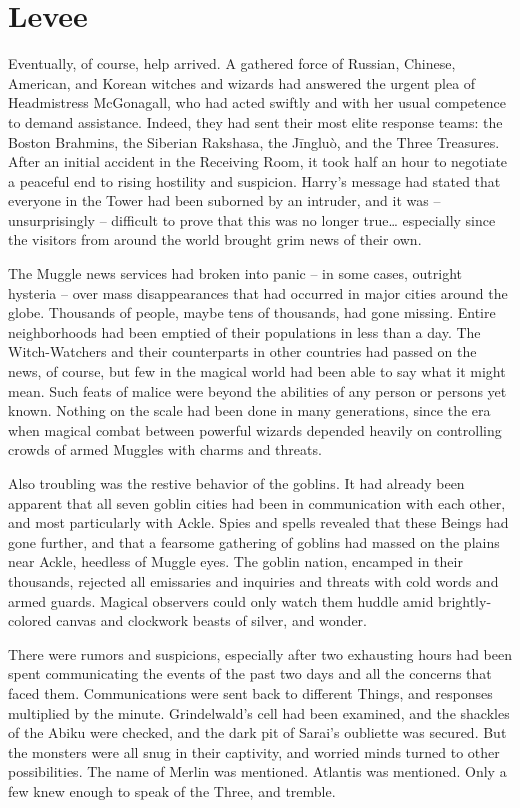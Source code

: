 \hypertarget{levee}{%
\chapter{Levee}\label{levee}}

Eventually, of course, help arrived. A gathered force of Russian,
Chinese, American, and Korean witches and wizards had answered the
urgent plea of Headmistress McGonagall, who had acted swiftly and with
her usual competence to demand assistance. Indeed, they had sent their
most elite response teams: the Boston Brahmins, the Siberian Rakshasa,
the Jīngluò, and the Three Treasures. After an initial accident in the
Receiving Room, it took half an hour to negotiate a peaceful end to
rising hostility and suspicion. Harry's message had stated that everyone
in the Tower had been suborned by an intruder, and it was --
unsurprisingly -- difficult to prove that this was no longer
true\ldots{} especially since the visitors from around the world brought
grim news of their own.

The Muggle news services had broken into panic -- in some cases,
outright hysteria -- over mass disappearances that had occurred in major
cities around the globe. Thousands of people, maybe tens of thousands,
had gone missing. Entire neighborhoods had been emptied of their
populations in less than a day. The Witch-Watchers and their
counterparts in other countries had passed on the news, of course, but
few in the magical world had been able to say what it might mean. Such
feats of malice were beyond the abilities of any person or persons yet
known. Nothing on the scale had been done in many generations, since the
era when magical combat between powerful wizards depended heavily on
controlling crowds of armed Muggles with charms and threats.

Also troubling was the restive behavior of the goblins. It had already
been apparent that all seven goblin cities had been in communication
with each other, and most particularly with Ackle. Spies and spells
revealed that these Beings had gone further, and that a fearsome
gathering of goblins had massed on the plains near Ackle, heedless of
Muggle eyes. The goblin nation, encamped in their thousands, rejected
all emissaries and inquiries and threats with cold words and armed
guards. Magical observers could only watch them huddle amid
brightly-colored canvas and clockwork beasts of silver, and wonder.

There were rumors and suspicions, especially after two exhausting hours
had been spent communicating the events of the past two days and all the
concerns that faced them. Communications were sent back to different
Things, and responses multiplied by the minute. Grindelwald's cell had
been examined, and the shackles of the Abiku were checked, and the dark
pit of Sarai's oubliette was secured. But the monsters were all snug in
their captivity, and worried minds turned to other possibilities. The
name of Merlin was mentioned. Atlantis was mentioned. Only a few knew
enough to speak of the Three, and tremble.

